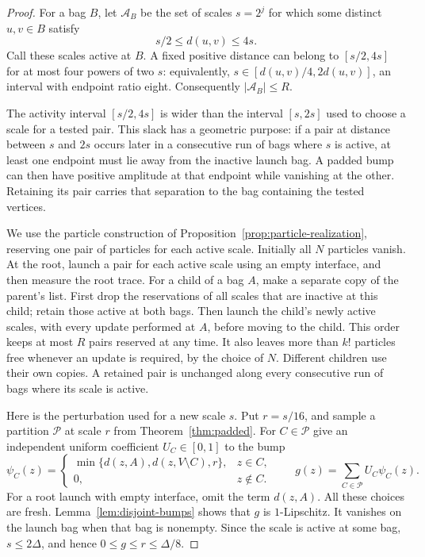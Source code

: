 \begin{proof}
For a bag $B$, let $\mathcal A_B$ be the set of scales $s=2^j$ for
which some distinct $u,v\in B$ satisfy
\[
  s/2\leq d(u,v)\leq4s.
\]
Call these scales active at $B$. A fixed positive distance can belong to
$[s/2,4s]$ for at most four powers of two $s$: equivalently,
$s\in[d(u,v)/4,2d(u,v)]$, an interval with endpoint ratio eight.
Consequently $|\mathcal A_B|\leq R$.

The activity interval $[s/2,4s]$ is wider than the interval $[s,2s]$
used to choose a scale for a tested pair. This slack has a geometric purpose:
if a pair at distance between $s$ and $2s$ occurs later in a consecutive run of bags where $s$ is active, at least one endpoint must lie away from the inactive launch bag.
A padded bump can then have positive amplitude at that endpoint while
vanishing at the other. Retaining its pair carries that separation to
the bag containing the tested vertices.

We use the particle construction of
Proposition~\ref{prop:particle-realization}, reserving one pair of
particles for each active scale. Initially all $N$ particles vanish.
At the root, launch a pair for each active scale using an empty interface,
and then measure the root trace. For a child of a bag $A$, make a separate
copy of the parent's list. First drop the reservations of all scales
that are inactive at this child; retain those active at both bags.
Then launch the child's newly active scales, with every update performed
at $A$, before moving to the child. This order keeps at most $R$ pairs
reserved at any time. It also leaves more than $k!$ particles free whenever
an update is required, by the choice of $N$. Different children use their
own copies. A retained pair is unchanged along every consecutive run of
bags where its scale is active.

Here is the perturbation used for a new scale $s$. Put $r=s/16$, and
sample a partition $\mathcal P$ at scale $r$ from
Theorem~\ref{thm:padded}. For $C\in\mathcal P$ give an independent
uniform coefficient $U_C\in[0,1]$ to the bump
\[
  \psi_C(z)=
  \begin{cases}
    \min\{d(z,A),d(z,V\setminus C),r\},&z\in C,\\
    0,&z\notin C.
  \end{cases}
  \qquad
  g(z)=\sum_{C\in\mathcal P}U_C\psi_C(z).
\]
For a root launch with empty interface, omit the term $d(z,A)$.
All these choices are fresh. Lemma~\ref{lem:disjoint-bumps} shows that
$g$ is $1$-Lipschitz.
It vanishes on the launch bag when that bag is nonempty. Since the scale
is active at some bag, $s\leq2\Delta$, and hence
$0\leq g\leq r\leq\Delta/8$.


\end{proof}

